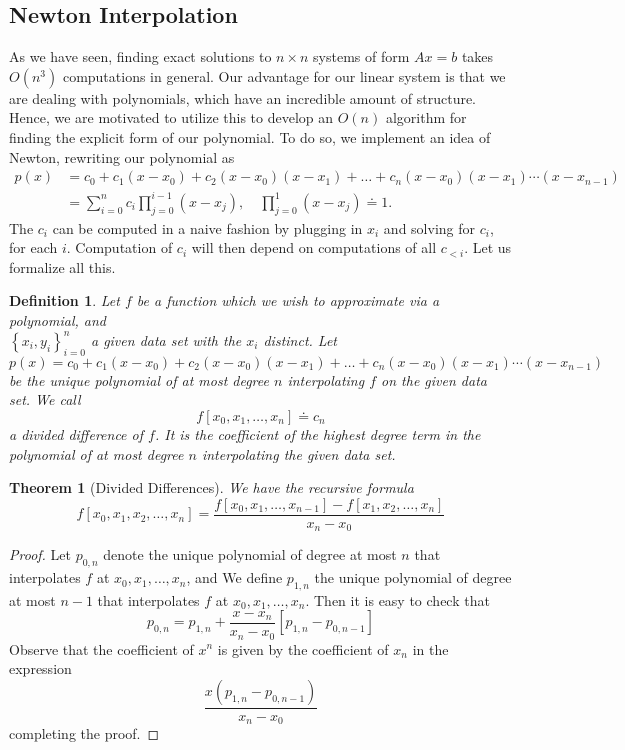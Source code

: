 \documentclass[12pt,reqno]{amsart}
\numberwithin{equation}{section}  %
\newtheorem{theorem}{Theorem}
\newtheorem*{definition}{Definition}
\begin{document}
\subsection{Newton Interpolation}
As we have seen, finding exact solutions to $n \times n$
systems of form $Ax = b$ takes $O(n^3)$ computations in general.
Our advantage for our linear system is that we are dealing with polynomials,
which have an incredible amount of structure. Hence, we are motivated
to utilize this to develop an $O(n)$ algorithm for finding the explicit
form of our polynomial. 
To do so, we implement an idea of Newton, rewriting our polynomial as
\begin{align*}
p(x) &= c_0 + c_1(x - x_0) + c_2(x - x_0)(x - x_1) + \ldots
+ c_{n}(x - x_0)(x - x_1)\cdots(x - x_{n-1})
\\
& = \sum_{i=0}^{n} c_i \prod_{j=0}^{i-1} (x - x_j), \quad \prod_{j=0}^{1} (x - x_j) \doteq 1.
\end{align*}
The $c_i$ can be computed in a naive fashion by plugging in $x_i$ 
and solving for $c_i$, for each $i$. Computation of $c_i$ will then depend
on computations of all $c_{< i}$. Let us formalize all this. 
\begin{definition}
Let $f$ be a function which we wish to approximate via a polynomial,
and \\ $ \left\{ x_i, y_i \right\}_{i=0}^{n} $ a given data set with the
$x_i$ distinct. Let
\begin{equation*}
p(x) = c_0 + c_1(x - x_0) + c_2(x - x_0)(x - x_1) + \ldots
+ c_{n}(x - x_0)(x - x_1)\cdots(x - x_{n-1})
\end{equation*}
be the unique polynomial of at most degree $n$ interpolating $f$
on the given data set. We call
\begin{equation*}
f[x_0, x_1, \ldots, x_n] \doteq c_n
\end{equation*}
a \emph{divided difference} of $f$. It is the coefficient of the
highest degree term in the polynomial of at most degree $n$ interpolating the
given data set. 
\end{definition}
\begin{theorem}[Divided Differences]
We have the recursive formula
\begin{equation*}
f[x_0, x_1, x_2, \ldots, x_n] = \frac{f[x_0, x_1, \ldots, x_{n-1}] - f[x_1, x_2, \ldots, x_n]}{x_n - x_0}
\end{equation*}
\end{theorem}
\begin{proof}
Let $p_{0,n}$ denote the unique polynomial of degree at most $n$ that
interpolates $f$ at $x_0, x_1, \ldots, x_n$, and  We define
$p_{1,n}$ the unique polynomial of degree at most $n-1$ that interpolates
$f$ at $x_0, x_1, \ldots, x_n$. Then it is easy to check that
\begin{equation*}
p_{0,n} = p_{1,n} + \frac{x - x_n}{x_n - x_0}[p_{1,n} - p_{0,n-1}]
\end{equation*}
Observe that the coefficient of $x^n$ is given by the coefficient of $x_n$ in the expression 
\begin{equation*}
\frac{x(p_{1,n} - p_{0,n-1})}{x_n - x_0}
\end{equation*}
completing the proof.
\end{proof}
\end{document}

